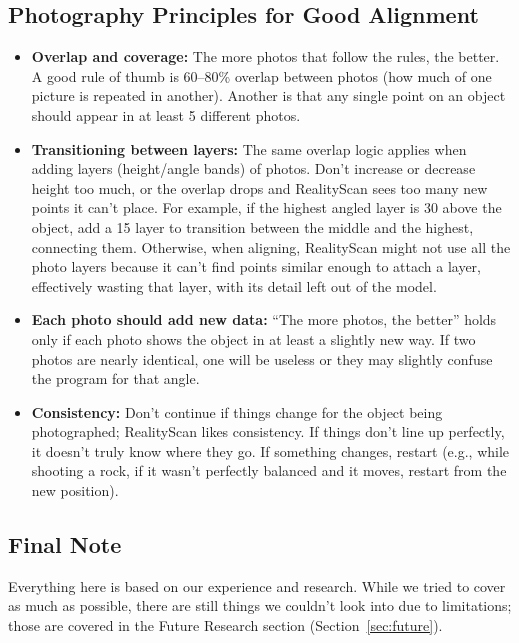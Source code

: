 \documentclass[11pt]{article}
\begin{document}
\subsection{Photography Principles for Good Alignment}
\begin{itemize}[leftmargin=1.4em]
  \item \textbf{Overlap and coverage:} The more photos that follow the rules, the better. A good rule of thumb is 60--80\% overlap between photos (how much of one picture is repeated in another). Another is that any single point on an object should appear in at least 5 different photos.
  \item \textbf{Transitioning between layers:} The same overlap logic applies when adding layers (height/angle bands) of photos. Don't increase or decrease height too much, or the overlap drops and RealityScan sees too many new points it can't place. For example, if the highest angled layer is 30\textdegree{} above the object, add a 15\textdegree{} layer to transition between the middle and the highest, connecting them. Otherwise, when aligning, RealityScan might not use all the photo layers because it can't find points similar enough to attach a layer, effectively wasting that layer, with its detail left out of the model.
  \item \textbf{Each photo should add new data:} ``The more photos, the better'' holds only if each photo shows the object in at least a slightly new way. If two photos are nearly identical, one will be useless or they may slightly confuse the program for that angle.
  \item \textbf{Consistency:} Don't continue if things change for the object being photographed; RealityScan likes consistency. If things don't line up perfectly, it doesn't truly know where they go. If something changes, restart (e.g., while shooting a rock, if it wasn't perfectly balanced and it moves, restart from the new position).
\end{itemize}

\subsection*{Final Note}
Everything here is based on our experience and research. While we tried to cover as much as possible, there are still things we couldn't look into due to limitations; those are covered in the Future Research section (Section~\ref{sec:future}).

\end{document}
